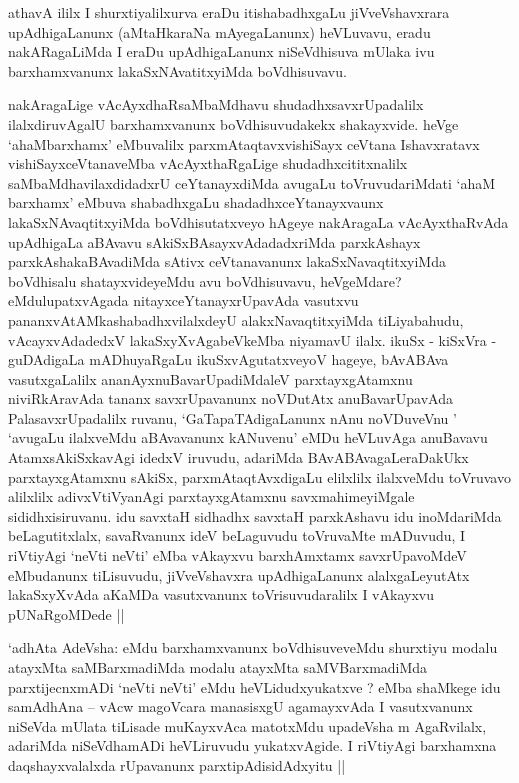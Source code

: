 \begin{artha}
athavA ililx I shurxtiyalilxurva eraDu itishabadhxgaLu jiVveVshavxrara
upAdhigaLanunx (aMtaHkaraNa mAyegaLanunx) heVLuvavu, eradu
nakARagaLiMda I eraDu upAdhigaLanunx niSeVdhisuva mUlaka ivu
barxhamxvanunx lakaSxNAvatitxyiMda boVdhisuvavu.

nakAragaLige vAcAyxdhaRsaMbaMdhavu shudadhxsavxrUpadalilx
ilalxdiruvAgalU barxhamxvanunx boVdhisuvudakekx shakayxvide. heVge
`ahaMbarxhamx' eMbuvalilx parxmAtaqtavxvishiSayx ceVtana Ishavxratavx
vishiSayxceVtanaveMba vAcAyxthaRgaLige shudadhxcititxnalilx
saMbaMdhavilaxdidadxrU ceYtanayxdiMda avugaLu toVruvudariMdati `ahaM
barxhamx' eMbuva shabadhxgaLu shadadhxceYtanayxvaunx
lakaSxNAvaqtitxyiMda boVdhisutatxveyo hAgeye nakAragaLa vAcAyxthaRvAda
upAdhigaLa aBAvavu sAkiSxBAsayxvAdadadxriMda parxkAshayx
parxkAshakaBAvadiMda sAtivx ceVtanavanunx lakaSxNavaqtitxyiMda
boVdhisalu shatayxvideyeMdu avu boVdhisuvavu, heVgeMdare?
eMdulupatxvAgada nitayxceYtanayxrUpavAda vasutxvu
pananxvAtAMkashabadhxvilalxdeyU alakxNavaqtitxyiMda tiLiyabahudu,
vAcayxvAdadedxV lakaSxyXvAgabeVkeMba niyamavU ilalx. ikuSx - kiSxVra -
guDAdigaLa mADhuyaRgaLu ikuSxvAgutatxveyoV hageye, bAvABAva
vasutxgaLalilx ananAyxnuBavarUpadiMdaleV parxtayxgAtamxnu
niviRkAravAda tananx savxrUpavanunx noVDutAtx anuBavarUpavAda
PalasavxrUpadalilx ruvanu, `GaTapaTAdigaLanunx nAnu noVDuveVnu '
`avugaLu ilalxveMdu aBAvavanunx kANuvenu' eMDu heVLuvAga anuBavavu
AtamxsAkiSxkavAgi idedxV iruvudu, adariMda BAvABAvagaLeraDakUkx
parxtayxgAtamxnu sAkiSx, parxmAtaqtAvxdigaLu elilxlilx ilalxveMdu
toVruvavo alilxlilx adivxVtiVyanAgi parxtayxgAtamxnu savxmahimeyiMgale
sididhxisiruvanu. idu savxtaH sidhadhx savxtaH parxkAshavu idu
inoMdariMda beLagutitxlalx, savaRvanunx ideV beLaguvudu toVruvaMte
mADuvudu, I riVtiyAgi `neVti neVti' eMba vAkayxvu barxhAmxtamx
savxrUpavoMdeV eMbudanunx tiLisuvudu, jiVveVshavxra upAdhigaLanunx
alalxgaLeyutAtx lakaSxyXvAda aKaMDa vasutxvanunx toVrisuvudaralilx I
vAkayxvu pUNaRgoMDede ||

`adhAta AdeVsha: eMdu barxhamxvanunx boVdhisuveveMdu shurxtiyu modalu
atayxMta saMBarxmadiMda modalu atayxMta saMVBarxmadiMda
parxtijecnxmADi `neVti neVti' eMdu heVLidudxyukatxve ? eMba shaMkege
idu samAdhAna -- vAcw magoVcara manasisxgU agamayxvAda I vasutxvanunx
niSeVda mUlata tiLisade muKayxvAca matotxMdu upadeVsha m AgaRvilalx,
adariMda niSeVdhamADi heVLiruvudu yukatxvAgide. I riVtiyAgi barxhamxna
daqshayxvalalxda rUpavanunx parxtipAdisidAdxyitu ||
\end{artha}

